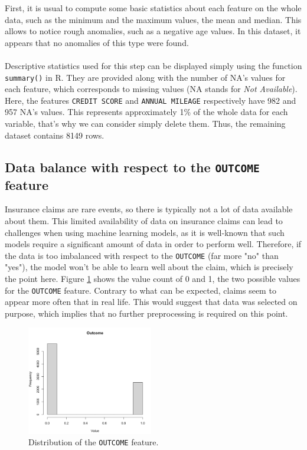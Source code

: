 \documentclass[a4paper,11pt, titlepage]{article}
\begin{document}
First, it is usual to compute some basic statistics about each feature on the whole data, such as the minimum and the maximum values, the mean and median. This allows to notice rough anomalies, such as a negative age values. In this dataset, it appears that no anomalies of this type were found.\\
\\
\noindent Descriptive statistics used for this step can be displayed simply using the function {\tt summary()} in R. They are provided along with the number of NA's values for each feature, which corresponds to missing values (NA stands for \textsl{Not Available}). Here, the features {\tt CREDIT SCORE} and {\tt ANNUAL MILEAGE} respectively have 982 and 957 NA's values. This represents approximately 1\% of the whole data for each variable, that's why we can consider simply delete them. Thus, the remaining dataset contains 8149 rows. 

\subsection{Data balance with respect to the {\tt OUTCOME} feature}

Insurance claims are rare events, so there is typically not a lot of data available about them. This limited availability of data on insurance claims can lead to challenges when using machine learning models, as it is well-known that such models require a significant amount of data in order to perform well. Therefore, if the data is too imbalanced with respect to the {\tt OUTCOME} (far more "no" than "yes"), the model won't be able to learn well about the claim, which is precisely the point here. Figure \ref{fig:outcome} shows the value count of 0 and 1, the two possible values for the {\tt OUTCOME} feature. Contrary to what can be expected, claims seem to appear more often that in real life. This would suggest that data was selected on purpose, which implies that no further preprocessing is required on this point. 

\begin{figure}
    \centering
    \includegraphics[width=5.5cm]{outcome.png}
    \caption{\centering Distribution of the {\tt OUTCOME} feature.}
    \label{fig:outcome}
\end{figure}
\end{document}

